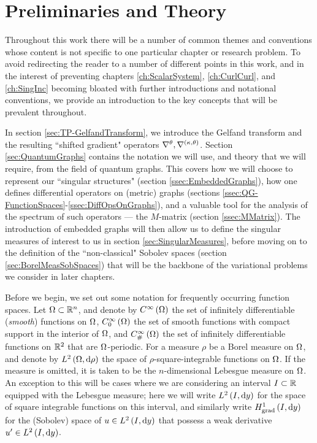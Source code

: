 \chapter{Preliminaries and Theory} \label{ch:TheoryPrelims}
Throughout this work there will be a number of common themes and conventions whose content is not specific to one particular chapter or research problem.
To avoid redirecting the reader to a number of different points in this work, and in the interest of preventing chapters \ref{ch:ScalarSystem}, \ref{ch:CurlCurl}, and \ref{ch:SingInc} becoming bloated with further introductions and notational conventions, we provide an introduction to the key concepts that will be prevalent throughout.

In section \ref{sec:TP-GelfandTransform}, we introduce the Gelfand transform and the resulting ``shifted gradient" operators $\nabla^{\theta}, \nabla^{\left( \kappa, \theta \right)}$.
Section \ref{sec:QuantumGraphs} contains the notation we will use, and theory that we will require, from the field of quantum graphs.
This covers how we will choose to represent our ``singular structures" (section \ref{ssec:EmbeddedGraphs}), how one defines differential operators on (metric) graphs (sections \ref{ssec:QG-FunctionSpaces}-\ref{ssec:DiffOpsOnGraphs}), and a valuable tool for the analysis of the spectrum of such operators --- the $M$-matrix (section \ref{ssec:MMatrix}).
The introduction of embedded graphs will then allow us to define the singular measures of interest to us in section \ref{sec:SingularMeasures}, before moving on to the definition of the ``non-classical" Sobolev spaces (section \ref{sec:BorelMeasSobSpaces}) that will be the backbone of the variational problems we consider in later chapters.

Before we begin, we set out some notation for frequently occurring function spaces.
Let $\Omega\subset\mathbb{R}^n$, and denote by $C^{\infty}\left( \Omega \right)$ the set of infinitely differentiable (\emph{smooth}) functions on $\Omega$, $C^{\infty}_{0}\left( \Omega \right)$ the set of smooth functions with compact support in the interior of $\Omega$, and $C^{\infty}_{\#}\left( \Omega \right)$ the set of infinitely differentiable functions on $\mathbb{R}^2$ that are $\Omega$-periodic.
For a measure $\rho$ be a Borel measure on $\Omega$, and denote by $L^{2}\left( \Omega,\mathrm{d} \rho \right)$ the space of $\rho$-square-integrable functions on $\Omega$.
If the measure is omitted, it is taken to be the $n$-dimensional Lebesgue measure on $\Omega$.
An exception to this will be cases where we are considering an interval $I\subset\mathbb{R}$ equipped with the Lebesgue measure; here we will write $L^{2}\left( I,\mathrm{d} y \right)$ for the space of square integrable functions on this interval, and similarly write $H^1_\mathrm{grad}\left( I, \mathrm{d}y \right)$ for the (Sobolev) space of $u\in L^{2}\left( I,\mathrm{d} y \right)$ that possess a weak derivative $u'\in L^{2}\left( I,\mathrm{d} y \right)$.









